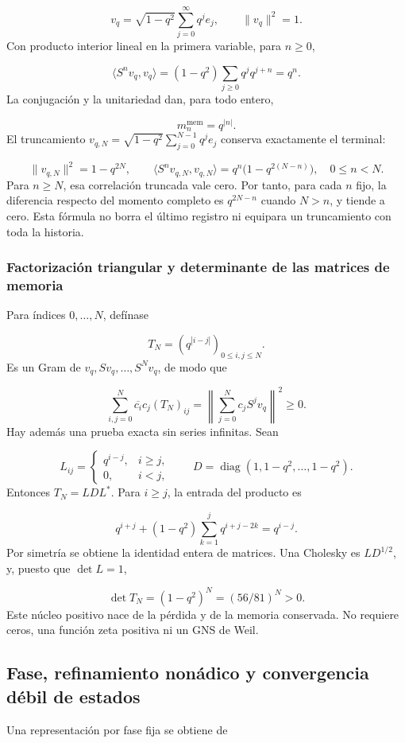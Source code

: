 \[
v_q=\sqrt{1-q^2}\sum_{j=0}^{\infty}q^j e_j,
\qquad \|v_q\|^2=1.
\]
Con producto interior lineal en la primera variable, para \(n\ge0\),

\[
\langle S^n v_q,v_q\rangle
=(1-q^2)\sum_{j\ge0}q^j q^{j+n}=q^n.
\]
La conjugación y la unitariedad dan, para todo entero,

\[
\boxed{m_n^{\mathrm{mem}}=q^{|n|}.}
\]
El truncamiento \(v_{q,N}=\sqrt{1-q^2}\sum_{j=0}^{N-1}q^j e_j\) conserva exactamente el terminal:

\[
\|v_{q,N}\|^2=1-q^{2N},\qquad
\langle S^n v_{q,N},v_{q,N}\rangle
=q^n\bigl(1-q^{2(N-n)}\bigr),\quad 0\le n<N.
\]
Para \(n\ge N\), esa correlación truncada vale cero. Por tanto, para cada \(n\) fijo, la diferencia respecto del momento completo es \(q^{2N-n}\) cuando \(N>n\), y tiende a cero. Esta fórmula no borra el último registro ni equipara un truncamiento con toda la historia.


\subsubsection{Factorización triangular y determinante de las matrices de memoria}
\label{tm-add-m2-2}
Para índices \(0,\ldots,N\), defínase

\[
T_N=(q^{|i-j|})_{0\le i,j\le N}.
\]
Es un Gram de \(v_q,Sv_q,\ldots,S^Nv_q\), de modo que

\[
\sum_{i,j=0}^{N}\overline{c_i}c_j(T_N)_{ij}
=\left\|\sum_{j=0}^{N}c_jS^jv_q\right\|^2\ge0.
\]
Hay además una prueba exacta sin series infinitas. Sean

\[
L_{ij}=\begin{cases}q^{i-j},&i\ge j,\\0,&i<j,\end{cases}
\qquad D=\operatorname{diag}(1,1-q^2,\ldots,1-q^2).
\]
Entonces \(T_N=LDL^*\). Para \(i\ge j\), la entrada del producto es

\[
q^{i+j}+(1-q^2)\sum_{k=1}^{j}q^{i+j-2k}
=q^{i-j}.
\]
Por simetría se obtiene la identidad entera de matrices. Una Cholesky es \(L D^{1/2}\), y, puesto que \(\det L=1\),

\[
\boxed{\det T_N=(1-q^2)^N=(56/81)^N>0.}
\]
Este núcleo positivo nace de la pérdida y de la memoria conservada. No requiere ceros, una función zeta positiva ni un GNS de Weil.


\subsection{Fase, refinamiento nonádico y convergencia débil de estados}
\label{tm-add-m3}
Una representación por fase fija se obtiene de

